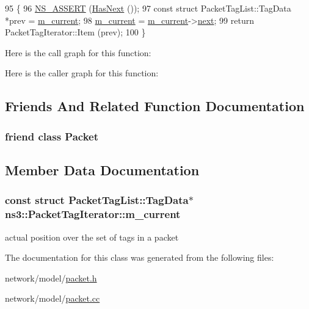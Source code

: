 \begin{DoxyCode}
95 \{
96   \hyperlink{assert_8h_a6dccdb0de9b252f60088ce281c49d052}{NS\_ASSERT} (\hyperlink{classns3_1_1PacketTagIterator_a242c5fb08749ee8debc0c1aee2523f00}{HasNext} ());
97   \textcolor{keyword}{const} \textcolor{keyword}{struct }PacketTagList::TagData *prev = \hyperlink{classns3_1_1PacketTagIterator_a187ae0b5be2c015084b119d9d1080716}{m\_current};
98   \hyperlink{classns3_1_1PacketTagIterator_a187ae0b5be2c015084b119d9d1080716}{m\_current} = \hyperlink{classns3_1_1PacketTagIterator_a187ae0b5be2c015084b119d9d1080716}{m\_current}->\hyperlink{structns3_1_1PacketTagList_1_1TagData_a9c4f438b752b46cdd695a68fca886822}{next};
99   \textcolor{keywordflow}{return} PacketTagIterator::Item (prev);
100 \}
\end{DoxyCode}


Here is the call graph for this function\+:




Here is the caller graph for this function\+:




\subsection{Friends And Related Function Documentation}
\subsubsection[{\texorpdfstring{Packet}{Packet}}]{\setlength{\rightskip}{0pt plus 5cm}friend class {\bf Packet}\hspace{0.3cm}{\ttfamily [friend]}}\hypertarget{classns3_1_1PacketTagIterator_ae51cb555166657e5996a76768db998e3}{}\label{classns3_1_1PacketTagIterator_ae51cb555166657e5996a76768db998e3}


\subsection{Member Data Documentation}
\subsubsection[{\texorpdfstring{m\+\_\+current}{m_current}}]{\setlength{\rightskip}{0pt plus 5cm}const struct {\bf Packet\+Tag\+List\+::\+Tag\+Data}$\ast$ ns3\+::\+Packet\+Tag\+Iterator\+::m\+\_\+current\hspace{0.3cm}{\ttfamily [private]}}\hypertarget{classns3_1_1PacketTagIterator_a187ae0b5be2c015084b119d9d1080716}{}\label{classns3_1_1PacketTagIterator_a187ae0b5be2c015084b119d9d1080716}


actual position over the set of tags in a packet 



The documentation for this class was generated from the following files\+:\begin{DoxyCompactItemize}
\item 
network/model/\hyperlink{packet_8h}{packet.\+h}\item 
network/model/\hyperlink{packet_8cc}{packet.\+cc}\end{DoxyCompactItemize}
